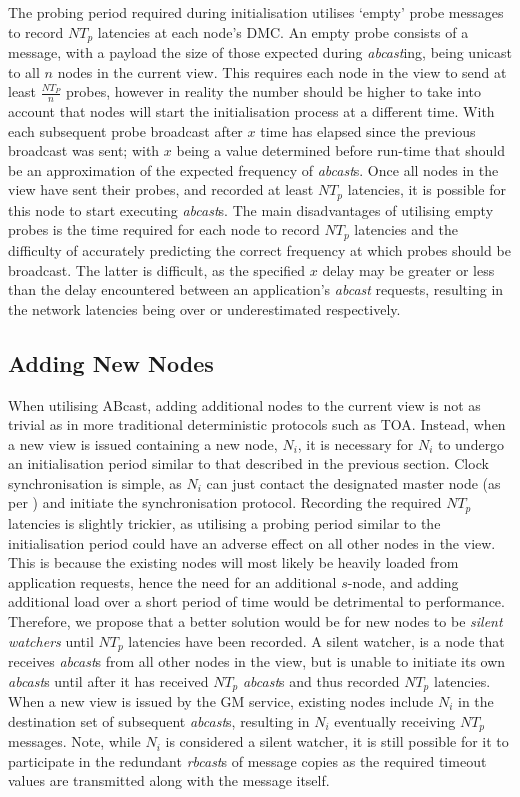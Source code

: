     The probing period required during initialisation utilises \textquoteleft{}empty' probe messages to record $NT_p$ latencies at each node's DMC.  An empty probe consists of a message, with a payload the size of those expected during \emph{abcast}ing, being unicast to all $n$ nodes in the current view.  This requires each node in the view to send at least $\frac{NT_P}{n}$ probes, however in reality the number should be higher to take into account that nodes will start the initialisation process at a different time.  With each subsequent probe broadcast after $x$ time has elapsed since the previous broadcast was sent; with $x$ being a value determined before run-time that should be an approximation of the expected frequency of \emph{abcast}s.  Once all nodes in the view have sent their probes, and recorded at least $NT_p$ latencies, it is possible for this node to start executing \emph{abcast}s.  The main disadvantages of utilising empty probes is the time required for each node to record $NT_p$ latencies and the difficulty of accurately predicting the correct frequency at which probes should be broadcast.  The latter is difficult, as the specified $x$ delay may be greater or less than the delay encountered between an application's \emph{abcast} requests, resulting in the network latencies being over or underestimated respectively.  
    
    \subsection{Adding New Nodes}
    When utilising \textsf{ABcast}, adding additional nodes to the current view is not as trivial as in more traditional deterministic protocols such as TOA.  Instead, when a new view is issued containing a new node, $N_i$, it is necessary for $N_i$ to undergo an initialisation period similar to that described in the previous section.  Clock synchronisation is simple, as $N_i$ can just contact the designated master node (as per \citep{Cristian:1996:SA:227210.227231}) and initiate the synchronisation protocol.  Recording the required $NT_p$ latencies is slightly trickier, as utilising a probing period similar to the initialisation period could have an adverse effect on all other nodes in the view.  This is because the existing nodes will most likely be heavily loaded from application requests, hence the need for an additional $s$-node, and adding additional load over a short period of time would be detrimental to performance.  Therefore, we propose that a better solution would be for new nodes to be \emph{silent watchers} until $NT_p$ latencies have been recorded.  A silent watcher, is a node that receives \emph{abcast}s from all other nodes in the view, but is unable to initiate its own \emph{abcast}s until after it has received $NT_p$ \emph{abcast}s and thus recorded $NT_p$ latencies.  When a new view is issued by the GM service, existing nodes include $N_i$ in the destination set of subsequent \emph{abcast}s, resulting in $N_i$ eventually receiving $NT_p$ messages.  Note, while $N_i$ is considered a silent watcher, it is still possible for it to participate in the redundant \emph{rbcast}s of message copies as the required timeout values are transmitted along with the message itself.      

